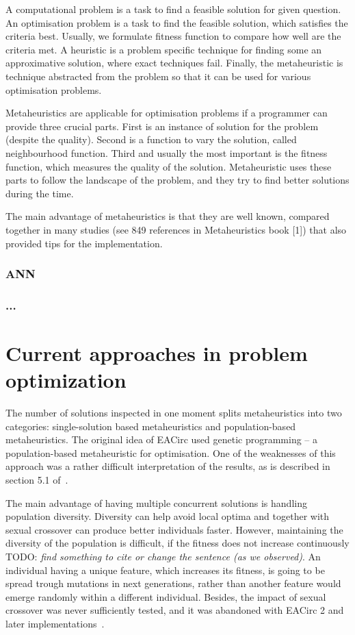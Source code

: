 \documentclass[
  print, %
  Table,   %
  nolof,     %
  nolot,     %
  11pt, %
  oneside  %
]{fithesis3}
\newcommand{\todo}[1]{TODO: \textit{#1}}
\begin{document}
A computational problem is a task to find a feasible solution for given question. An optimisation problem is a task to find the feasible solution, which satisfies the criteria best. Usually, we formulate fitness function to compare how well are the criteria met. A heuristic is a problem specific technique for finding some an approximative solution, where exact techniques fail. Finally, the metaheuristic is technique abstracted from the problem so that it can be used for various optimisation problems.

Metaheuristics are applicable for optimisation problems if a programmer can provide three crucial parts. First is an instance of solution for the problem (despite the quality). Second is a function to vary the solution, called neighbourhood function. Third and usually the most important is the fitness function, which measures the quality of the solution. Metaheuristic uses these parts to follow the landscape of the problem, and they try to find better solutions during the time.

The main advantage of metaheuristics is that they are well known, compared together in many studies (see 849 references in Metaheuristics book [1]) that also provided tips for the implementation.

\subsection{ANN}
\label{subsec:prob-opt-ann}

\subsection{...}

\chapter{Current approaches in problem optimization}
\label{chap:optimisation}

The number of solutions inspected in one moment splits metaheuristics into two categories: single-solution based metaheuristics and population-based metaheuristics. The original idea of EACirc used genetic programming -- a population-based metaheuristic for optimisation. One of the weaknesses of this approach was a rather difficult interpretation of the results, as is described in section 5.1 of~\cite{ukropBcThesis}.

The main advantage of having multiple concurrent solutions is handling population diversity. Diversity can help avoid local optima and together with sexual crossover can produce better individuals faster. However, maintaining the diversity of the population is difficult, if the fitness does not increase continuously \todo{find something to cite or change the sentence (as we observed)}. An individual having a unique feature, which increases its fitness, is going to be spread trough mutations in next generations, rather than another feature would emerge randomly within a different individual. Besides, the impact of sexual crossover was never sufficiently tested, and it was abandoned with EACirc 2 and later implementations~\cite{ukropMgrThesis,sys2014constructing}.
\end{document}
